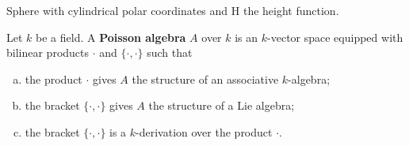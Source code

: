 \documentclass{amsart}
\begin{document}
\begin{example}
    Sphere with cylindrical polar coordinates and H the height function.
\end{example}

\begin{definition}
    Let $k$ be a field.
    A \textbf{Poisson algebra} $A$ over $k$ is an $k$-vector space equipped with bilinear products
    $\cdot$ and $\{\cdot,\cdot\}$ such that
    \begin{enumerate}[(a)]
        \item the product $\cdot$ gives $A$ the structure of an associative $k$-algebra;
        \item the bracket $\{\cdot,\cdot\}$ gives $A$ the structure of a Lie algebra;
        \item the bracket $\{\cdot,\cdot\}$ is a $k$-derivation over the product $\cdot$.
    \end{enumerate}
\end{definition}
\end{document}
